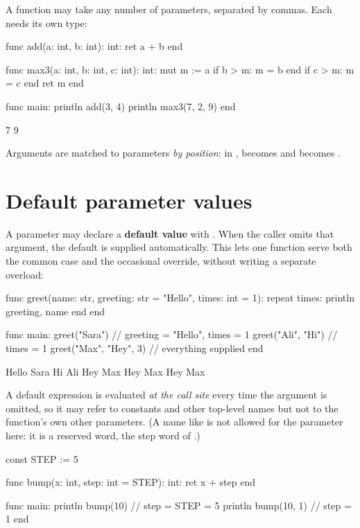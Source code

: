 A function may take any number of parameters, separated by commas. Each needs its
own type:

\begin{salamen}
func add(a: int, b: int): int:
    ret a + b
end

func max3(a: int, b: int, c: int): int:
    mut m := a
    if b > m: m = b end
    if c > m: m = c end
    ret m
end

func main:
    println add(3, 4)
    println max3(7, 2, 9)
end
\end{salamen}

\begin{progout}
7
9
\end{progout}

Arguments are matched to parameters \emph{by position}: in ,
 becomes  and  becomes .

\section{Default parameter values}

A parameter may declare a \textbf{default value} with \code{=}. When the caller
omits that argument, the default is supplied automatically. This lets one
function serve both the common case and the occasional override, without writing
a separate overload:

\begin{salamen}
func greet(name: str, greeting: str = "Hello", times: int = 1):
    repeat times:
        println greeting, name
    end
end

func main:
    greet("Sara")              // greeting = "Hello", times = 1
    greet("Ali", "Hi")         // times = 1
    greet("Max", "Hey", 3)     // everything supplied
end
\end{salamen}

\begin{progout}
Hello Sara
Hi Ali
Hey Max
Hey Max
Hey Max
\end{progout}

A default expression is evaluated \emph{at the call site} every time the argument
is omitted, so it may refer to constants and other top-level names but not to the
function's own other parameters. (A name like  is not allowed for the
parameter here: it is a reserved word, the step word of .)

\begin{salamen}
const STEP := 5

func bump(x: int, step: int = STEP): int:
    ret x + step
end

func main:
    println bump(10)       // step = STEP = 5
    println bump(10, 1)    // step = 1
end
\end{salamen}

